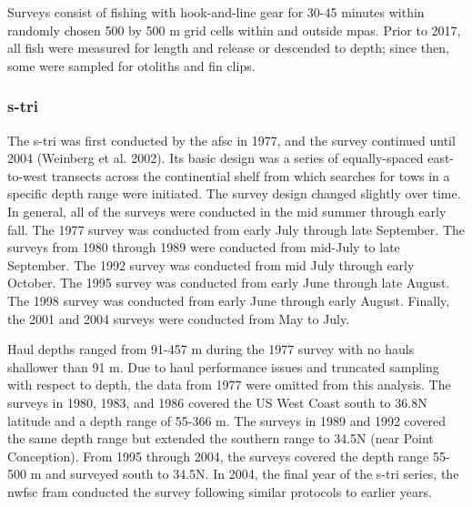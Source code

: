 \documentclass[11pt,
  english,
  a4paper,
]{article}
\begin{document}
\leavevmode\tagmcend\tagstructend\par


Surveys consist of fishing with hook-and-line gear for 30-45 minutes within randomly chosen 500 by 500 m grid cells within and outside \Gls{mpa}s. Prior to 2017, all fish were measured for length and release or descended to depth; since then, some were sampled for otoliths and fin clips.

\leavevmode\tagmcend\tagstructend\par


\hypertarget{section-2}{%
\subsubsection{\texorpdfstring{\acrlong{s-tri}}{}}\label{section-2}}

\leavevmode\tagmcend\tagstructend


The \gls{s-tri} was first conducted by the \gls{afsc} in 1977, and the survey continued until 2004 {(Weinberg et al. 2002)\leavevmode\tagmcend\tagstructend}. Its basic design was a series of equally-spaced east-to-west transects across the continential shelf from which searches for tows in a specific depth range were initiated. The survey design changed slightly over time. In general, all of the surveys were conducted in the mid summer through early fall. The 1977 survey was conducted from early July through late September. The surveys from 1980 through 1989 were conducted from mid-July to late September. The 1992 survey was conducted from mid July through early October. The 1995 survey was conducted from early June through late August. The 1998 survey was conducted from early June through early August. Finally, the 2001 and 2004 surveys were conducted from May to July.

\leavevmode\tagmcend\tagstructend\par


Haul depths ranged from 91-457 m during the 1977 survey with no hauls shallower than 91 m. Due to haul performance issues and truncated sampling with respect to depth, the data from 1977 were omitted from this analysis. The surveys in 1980, 1983, and 1986 covered the US West Coast south to 36.8\textdegree N latitude and a depth range of 55-366 m. The surveys in 1989 and 1992 covered the same depth range but extended the southern range to 34.5\textdegree N (near Point Conception). From 1995 through 2004, the surveys covered the depth range 55-500 m and surveyed south to 34.5\textdegree N. In 2004, the final year of the \gls{s-tri} series, the \gls{nwfsc} \gls{fram} conducted the survey following similar protocols to earlier years.
\end{document}
